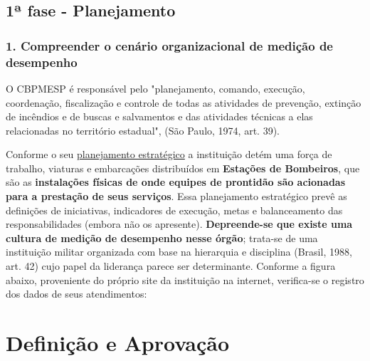 \documentclass[
  letterpaper,
  DIV=11,
  numbers=noendperiod]{scrreprt}
\begin{document}

\hypertarget{uxaa-fase---planejamento-1}{%
\section*{1ª fase - Planejamento}\label{uxaa-fase---planejamento-1}}


\hypertarget{compreender-o-cenuxe1rio-organizacional-de-mediuxe7uxe3o-de-desempenho-1}{%
\subsection*{1. Compreender o cenário organizacional de medição de
desempenho}\label{compreender-o-cenuxe1rio-organizacional-de-mediuxe7uxe3o-de-desempenho-1}}

O CBPMESP é responsável pelo "planejamento, comando, execução,
coordenação, fiscalização e controle de todas as atividades de
prevenção, extinção de incêndios e de buscas e salvamentos e das
atividades técnicas a elas relacionadas no território estadual", (São
Paulo, 1974, art. 39).

Conforme o seu
\href{http://www.ccb.policiamilitar.sp.gov.br/portalcb/_institucional/midias/Planejamento-Estrate\%CC\%81gico-14DEZ20.pdf}{planejamento
estratégico} a instituição detém uma força de trabalho, viaturas e
embarcações distribuídos em \textbf{Estações de Bombeiros}, que são as
\textbf{instalações físicas de onde equipes de prontidão são acionadas
para a prestação de seus serviços}. Essa planejamento estratégico prevê
as definições de iniciativas, indicadores de execução, metas e
balanceamento das responsabilidades (embora não os apresente).
\textbf{Depreende-se que existe uma cultura de medição de desempenho
nesse órgão}; trata-se de uma instituição militar organizada com base na
hierarquia e disciplina (Brasil, 1988, art. 42) cujo papel da liderança
parece ser determinante. Conforme a figura abaixo, proveniente do
próprio site da instituição na internet, verifica-se o registro dos
dados de seus atendimentos:

\hypertarget{definiuxe7uxe3o-e-aprovauxe7uxe3o}{%
\chapter*{Definição e
Aprovação}\label{definiuxe7uxe3o-e-aprovauxe7uxe3o}}
\end{document}
